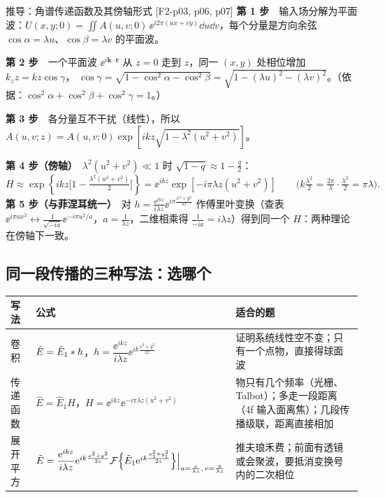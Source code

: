 \begin{exam}{推导：角谱传递函数及其傍轴形式 [F2-p03, p06, p07]}
\textbf{第 1 步}　输入场分解为平面波：$U(x,y;0)=\iint A(u,v;0)\,\ee^{i2\pi(ux+vy)}\dd u\dd v$，每个分量是方向余弦 $\cos\alpha=\lambda u$、$\cos\beta=\lambda v$ 的平面波。

\textbf{第 2 步}　一个平面波 $\ee^{i\bm k\cdot\bm r}$ 从 $z=0$ 走到 $z$，同一 $(x,y)$ 处相位增加 $k_z z=kz\cos\gamma$，
$\cos\gamma=\sqrt{1-\cos^2\alpha-\cos^2\beta}=\sqrt{1-(\lambda u)^2-(\lambda v)^2}$。（依据：$\cos^2\alpha+\cos^2\beta+\cos^2\gamma=1$。）

\textbf{第 3 步}　各分量互不干扰（线性），所以 $A(u,v;z)=A(u,v;0)\exp\!\left[ikz\sqrt{1-\lambda^2(u^2+v^2)}\right]$。

\textbf{第 4 步（傍轴）}　$\lambda^2(u^2+v^2)\ll1$ 时 $\sqrt{1-q}\approx1-\frac q2$：
\[
H\approx\exp\!\left\{ikz\Big[1-\tfrac{\lambda^2(u^2+v^2)}{2}\Big]\right\}=\ee^{ikz}\exp[-i\pi\lambda z(u^2+v^2)]\qquad\Big(k\tfrac{\lambda^2}{2}=\tfrac{2\pi}{\lambda}\cdot\tfrac{\lambda^2}{2}=\pi\lambda\Big).
\]
\textbf{第 5 步（与菲涅耳统一）}　对 $h=\frac{\ee^{ikz}}{i\lambda z}\ee^{i\pi\frac{x^2+y^2}{\lambda z}}$ 作傅里叶变换（查表 $\ee^{i\pi ax^2}\leftrightarrow\frac{1}{\sqrt{-ia}}\ee^{-i\pi u^2/a}$，$a=\frac1{\lambda z}$，二维相乘得 $\frac{1}{-ia}=i\lambda z$）得到同一个 $H$：两种理论在傍轴下一致。
\end{exam}

\subsection*{同一段传播的三种写法：选哪个}\label{sec:propforms}
\begin{center}\small\renewcommand{\arraystretch}{1.5}
\begin{tabular}{@{}P{2.4cm}P{6.9cm}P{7.1cm}@{}}
\toprule
写法 & 公式 & 适合的题\\ \midrule
卷积 & $\tilde E=\tilde E_1\ast h$，$h=\dfrac{\ee^{ikz}}{i\lambda z}\ee^{ik\frac{x^2+y^2}{2z}}$ & 证明系统线性空不变；只有一个点物，直接得球面波\\
传递函数 & $\hat E=\hat E_1H$，$H=\ee^{ikz}\ee^{-i\pi\lambda z(u^2+v^2)}$ & 物只有几个频率（光栅、Talbot）；多走一段距离（4f 输入面离焦）；几段传播级联，距离直接相加\\
展开平方 & $\tilde E=\dfrac{\mathrm{e}^{ikz}}{i\lambda z}\mathrm{e}^{ik\frac{x^2+y^2}{2z}}\mathcal{F}\Big\{\tilde E_1\mathrm{e}^{ik\frac{x_1^2+y_1^2}{2z}}\Big\}\Big|_{u=\frac{x}{\lambda z},\,v=\frac{y}{\lambda z}}$ & 推夫琅禾费；前面有透镜或会聚波，要抵消变换号内的二次相位\\
\bottomrule
\end{tabular}
\end{center}

